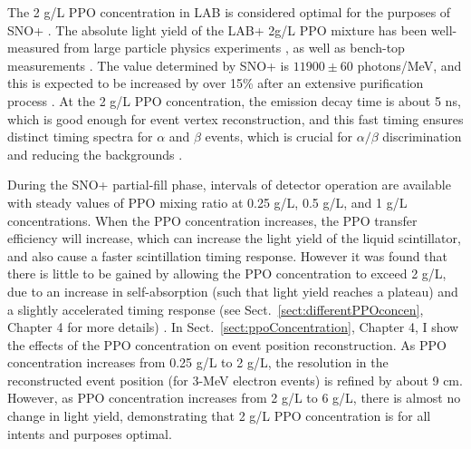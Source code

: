 The 2 g/L PPO concentration in LAB is considered optimal for the purposes of SNO+ \cite{whitepaper}. The absolute light yield of the LAB+ 2g/L PPO mixture has been well-measured from large particle physics experiments \cite{agostini2018comprehensive,xing2015preliminary}, as well as bench-top measurements \cite{xing2015preliminary,kaptanoglu2019cherenkov, novikov}. The value determined by SNO+ is $11900\pm 60$ photons/MeV, and this is expected to be increased by over 15\% after an extensive purification process \cite{snop_jinst,grullon2014light}. At the 2 g/L PPO concentration, the emission decay time is about 5 ns, which is good enough for event vertex reconstruction, and this fast timing ensures distinct timing spectra for $\alpha$ and $\beta$ events, which is crucial for $\alpha/\beta$ discrimination and reducing the backgrounds \cite{snop_jinst}. 

During the SNO+ partial-fill phase, intervals of detector operation are available with steady values of PPO mixing ratio at 0.25 g/L, 0.5 g/L, and 1 g/L concentrations. When the PPO concentration increases, the PPO transfer efficiency will increase, which can increase the light yield of the liquid scintillator, and also cause a faster scintillation timing response. However it was found that there is little to be gained by allowing the PPO concentration to exceed 2 g/L, due to an increase in self-absorption (such that light yield reaches a plateau) and a slightly accelerated timing response (see Sect.~\ref{sect:differentPPOconcen}, Chapter 4 for more details) \cite{snop_jinst,collaboration2020development}. In Sect.~\ref{sect:ppoConcentration}, Chapter 4, I show the effects of the PPO concentration on event position reconstruction. As PPO concentration increases from 0.25 g/L to 2 g/L, the resolution in the reconstructed event position (for 3-MeV electron events) is refined by about 9 cm. However, as PPO concentration increases from 2 g/L to 6 g/L, there is almost no change in light yield, demonstrating that 2 g/L PPO concentration is for all intents and purposes optimal.

